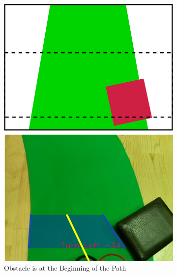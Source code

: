 \documentclass[a4paper,12pt]{article}
\begin{document}
	\begin{figure}[H]
	\setlength{\unitlength}{\textwidth} 
	\centering
	\begin{subfigure}{.31\textwidth}
		\centering
		\includegraphics[width=0.30\unitlength]{images/path_images/down_1}
		\caption{\label{fig:dataP_down_1} Obstacle is at the Beginning of the Path}
	\end{subfigure}%
	\begin{subfigure}{.31\textwidth}
		\centering

\end{subfigure}
\end{figure}
\end{document}

